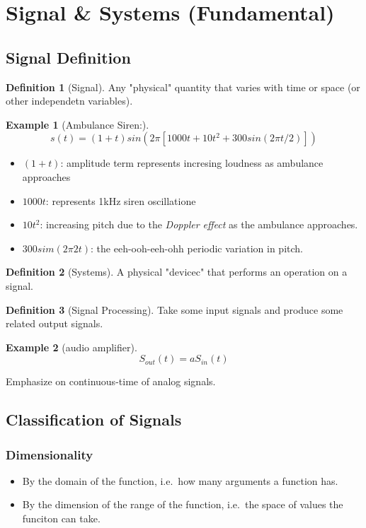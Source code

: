 \documentclass{article}
\theoremstyle{definition}
\newtheorem{definition}{Definition}[subsection]
\newtheorem{example}{Example}[section]
\begin{document}
\tableofcontents

\section{Signal \& Systems (Fundamental)}
\subsection{Signal Definition}
\begin{definition}[Signal]
    Any "physical" quantity that varies with time or space (or other independetn variables).
\end{definition}
\begin{example}[Ambulance Siren:]
    \begin{equation}
        s(t) = (1+t)sin(2\pi [1000t+10t^2+300sin(2\pi t /2)]) 
    \end{equation}
    \begin{itemize}
        \item $ (1+t) $: amplitude term represents incresing loudness as ambulance approaches
        \item $ 1000t $: represents 1kHz siren oscillatione
        \item $ 10t^2 $: increasing pitch due to the \emph{Doppler effect} as the ambulance approaches.
        \item $ 300sim(2\pi 2t) $: the eeh-ooh-eeh-ohh periodic variation in pitch.
    \end{itemize} 
\end{example}

\begin{definition}[Systems]
    A physical "devicec" that performs an operation on a signal.
\end{definition}
\begin{definition}[Signal Processing]
    Take some input signals and produce some related output signals.
\end{definition}
\begin{example}[audio amplifier]
    \begin{equation}
        S_{out}(t) = aS_{in}(t)
    \end{equation}
\end{example}
Emphasize on continuous-time of analog signals.
\subsection{Classification of Signals}
\subsubsection{Dimensionality}
\begin{itemize}
    \item By the domain of the function, i.e.\ how many arguments a function has.
    \item By the dimension of the range of the function, i.e.\ the space of values the funciton can take.
\end{itemize}
\end{document}
